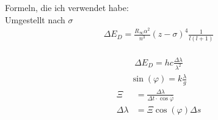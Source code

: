 Formeln, die ich verwendet habe: \\
Umgestellt nach $\sigma$
\begin{align}
	\Delta E_D = \frac{R_\infty\alpha^2}{n^3}(z-\sigma)^4\frac{1}{l(l+1)}
\end{align}
\ \\
\begin{align}
	\Delta E_D = hc\frac{\Delta \lambda}{\lambda^2}
\end{align}
\begin{align}
	\sin(\varphi) = k\frac{\lambda}{g}
\end{align}
\begin{align}
	\Xi &= \frac{\Delta\lambda}{\Delta t\cdot\cos\overline{\varphi}} \\
	\Delta \lambda &= \Xi \cos(\varphi)\Delta s
\end{align}